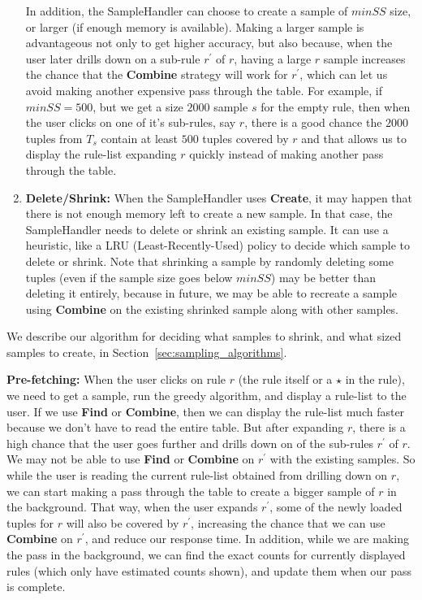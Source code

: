 \begin{enumerate}
In addition, the SampleHandler can choose to create a sample of $minSS$ size, or larger (if enough memory is available). Making a larger sample is advantageous not only to get higher accuracy, but also because, when the user later drills down on a sub-rule $r^{\prime}$ of $r$, having a large $r$ sample increases the chance that the \textbf{Combine} strategy will work for $r^{\prime}$, which can let us avoid making another expensive pass through the table. For example, if $minSS = 500$, but we get a size $2000$ sample $s$ for the empty rule, then when the user clicks on one of it's sub-rules, say $r$, there is a good chance the $2000$ tuples from $T_s$ contain at least $500$ tuples covered by $r$ and that allows us to display the rule-list expanding $r$ quickly instead of making another pass through the table. 

\item \textbf{Delete/Shrink:} When the SampleHandler uses \textbf{Create}, it may happen that there is not enough memory left to create a new sample. In that case, the SampleHandler needs to delete or shrink an existing sample. It can use a heuristic, like a LRU (Least-Recently-Used) policy to decide which sample to delete or shrink. Note that shrinking a sample by randomly deleting some tuples (even if the sample size goes below $minSS$) may be better than deleting it entirely, because in future, we may be able to recreate a sample using \textbf{Combine} on the existing shrinked sample along with other samples.
\end{enumerate}

We describe our algorithm for deciding what samples to shrink, and what sized samples to create, in Section~\ref{sec:sampling_algorithms}. 

\textbf{Pre-fetching:} When the user clicks on rule $r$ (the rule itself or a $\star$ in the rule), we need to get a sample, run the greedy algorithm, and display a rule-list to the user. If we use \textbf{Find} or \textbf{Combine}, then we can display the rule-list much faster because we don't have to read the entire table. But after expanding $r$, there is a high chance that the user goes further and drills down on of the sub-rules $r^{\prime}$ of $r$. We may not be able to use \textbf{Find} or \textbf{Combine} on $r^{\prime}$ with the existing samples. So while the user is reading the current rule-list obtained from drilling down on $r$, we can start making a pass through the table to create a bigger sample of $r$ in the background. That way, when the user expands $r^{\prime}$, some of the newly loaded tuples for $r$ will also be covered by $r^{\prime}$, increasing the chance that we can use \textbf{Combine} on $r^{\prime}$, and reduce our response time. 
In addition, while we are making the pass in the background, we can find the exact counts for currently displayed rules (which only have estimated counts shown), and update them when our pass is complete.

